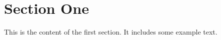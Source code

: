 \section{Section One}
This is the content of the first section. It includes some example text.

\lipsum[1] %

